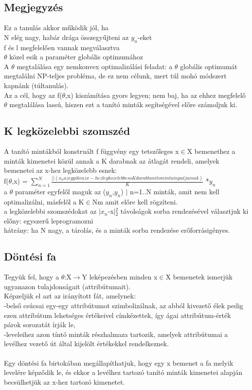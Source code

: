 \documentclass{article}
\begin{document}
	 \subsection{Megjegyzés}
	 Ez a tanulás akkor működik jól, ha\\
	 N elég nagy, habár drága összegyűjteni az $y_n$-eket\\
	 f és l megfelelően vannak megválasztva\\
	 $\theta$ közel esik a paraméter globális optimumához\\
	 A $\theta$ megtalálása egy nemkonvex optimalizálási feladat: a $\theta$ globális optimumát megtalálni NP-teljes probléma, de ez nem célunk, mert túl mohó módszert kapnánk (túltanulás).\\
	 Az a cél, hogy az f($\theta$,x) kiszámítása gyors legyen; nem baj, ha az ehhez megfelelő $\theta$ megtalálása lassú, hiszen ezt a tanító minták segítségével előre számoljuk ki.\\
	 
	 \subsection{K legközelebbi szomszéd}
	 A tanító mintákból konstruált f függvény egy tetszőleges x$\in$X bemenethez a minták kimenetei közül annak a K darabnak az átlagát rendeli, amelyek bemenetei az x-hez legközelebb esnek:\\
	 f($\theta$,x) = $\sum_{n=1}^{N}$$\frac{||(x_n az egyike az x-hez legkozelebb eso K darab tanito minta inputjainak)}{K}$ *$y_n$\\
	 a $\theta$ paraméter egyfelől maguk az {($y_n$,$y_n$) $|$ n=1..N} minták, amit nem kell optimalizálni, másfelől a K$\in$Nm amit előre kell rögzíteni.\\
	 a legközelebbi szomszédokat az $|$$x_n$-x$|$$^2_2$	 távolságok sorba rendezésével választjuk ki\\
	 előny: egyszerű leprogramozni\\
	 hátrány: ha N nagy, a tárolás, és a minták sorba rendezése erőforrásigényes.\\
	 
	 \subsection{Döntési fa}
	 Tegyük fel, hogy a $\theta$:X$\rightarrow$Y leképezésben minden x$\in$X bemenetek ismerjük ugyanazon tulajdonságait (attribútumait).\\
	 Képzeljük el azt az irányított fát, amelynek:\\
	 -belső csúcsai egy-egy attribútumot szimbolizálnak, az abból kivezető élek pedig ezen attribútum lehetséges értékeivel címkézettek, így ágai attribútum-érték párok sorozatát írják le,\\
	 -leveleihez azon tíntó minták részhalmaza tartozik, amelyek attribútumai a levélhez vezető út által kijelölt értékekkel rendelkeznek.\\ \\
	 Egy döntési fa birtokában megállapíthatjuk, hogy egy x bemenet a fa melyik levelére képződik le, és ekkor a levélhez tartozó tanító minták kimenetei alapján becsülhetjük az x-hez tartozó kimenetet.\\
	 
\end{document}
